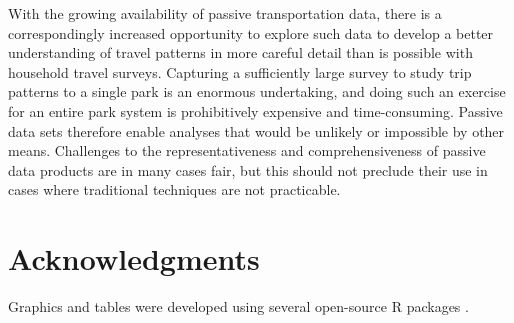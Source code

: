 \documentclass[3p, authoryear]{elsarticle} %
\begin{document}
With the growing availability of passive transportation data, there is a
correspondingly increased opportunity to explore such data to develop a better
understanding of travel patterns in more careful detail than is possible with
household travel surveys. Capturing a sufficiently large survey to study trip
patterns to a single park is an enormous undertaking, and doing such an exercise
for an entire park system is prohibitively expensive and time-consuming. Passive
data sets therefore enable analyses that would be unlikely or impossible by
other means. Challenges to the representativeness and comprehensiveness of
passive data products are in many cases fair, but this should not preclude their
use in cases where traditional techniques are not practicable.

\hypertarget{acknowledgments}{%
\section*{Acknowledgments}\label{acknowledgments}}

Graphics and tables were developed using several open-source R packages
\citep{ggmap, modelsummary, wesanderson}.


\end{document}
